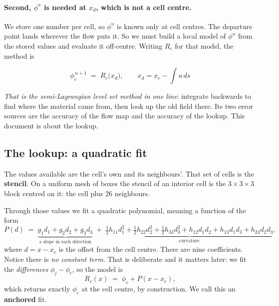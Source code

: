 \documentclass[11pt,a4paper]{article}
\begin{document}
\paragraph{Second, \(\phi^n\) is needed at \(x_d\), which is not a cell centre.}
We store one number per cell, so \(\phi^n\) is known only at cell centres. The departure point
lands wherever the flow puts it. So we must build a local model of \(\phi^n\) from the stored
values and evaluate it off-centre. Writing \(R_c\) for that model, the method is

\begin{equation}
  \boxed{\;\phi_c^{\,n+1} \;=\; R_c\bigl(x_d\bigr),\qquad x_d = x_c - \!\!\int u\,ds\;}
  \label{eq:slls}
\end{equation}

\emph{That is the semi-Lagrangian level set method in one line}: integrate backwards to find
where the material came from, then look up the old field there. Its two error sources are the
accuracy of the flow map and the accuracy of the lookup. This document is about the lookup.

\subsection{The lookup: a quadratic fit}

The values available are the cell's own and its neighbours'. That set of cells is the
\textbf{stencil}. On a uniform mesh of boxes the stencil of an interior cell is the
\(3\times3\times3\) block centred on it: the cell plus 26 neighbours.

Through those values we fit a quadratic polynomial, meaning a function of the form
\begin{equation}
  P(d) \;=\; \underbrace{g_1 d_1 + g_2 d_2 + g_3 d_3}_{\text{a slope in each direction}}
            \;+\; \underbrace{\tfrac12 h_{11} d_1^2 + \tfrac12 h_{22} d_2^2 + \tfrac12 h_{33} d_3^2
                              + h_{12} d_1 d_2 + h_{13} d_1 d_3 + h_{23} d_2 d_3}_{\text{curvature}},
  \label{eq:poly}
\end{equation}
where \(d = x - x_c\) is the offset from the cell centre. There are nine coefficients. Notice
there is \emph{no constant term}. That is deliberate and it matters later: we fit the
\emph{differences} \(\phi_j - \phi_c\), so the model is
\begin{equation}
  R_c(x) \;=\; \phi_c + P(x - x_c),
  \label{eq:anchored}
\end{equation}
which returns exactly \(\phi_c\) at the cell centre, by construction. We call this an
\textbf{anchored} fit.
\end{document}
